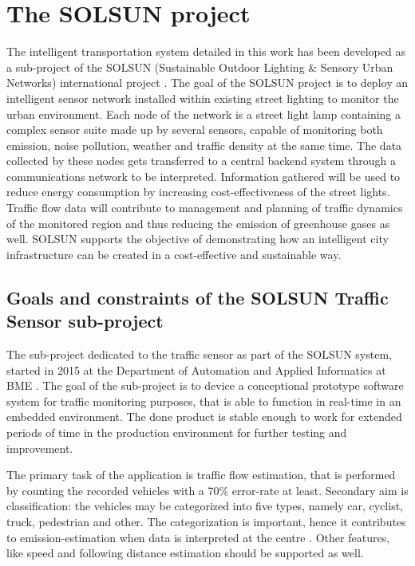 \section{The SOLSUN project}
The intelligent transportation system detailed in this work has been developed as a sub-project of the SOLSUN (Sustainable Outdoor Lighting \& Sensory Urban Networks) international project \cite{SOLSUN}.
The goal of the SOLSUN project is to deploy an intelligent sensor network installed within existing street lighting to monitor the urban environment.
Each node of the network is a street light lamp containing a complex sensor suite made up by several sensors, capable of monitoring both emission, noise pollution, weather and traffic density at the same time.
The data collected by these nodes gets transferred to a central backend system through a communications network to be interpreted.
Information gathered will be used to reduce energy consumption by increasing cost-effectiveness of the street lights.
Traffic flow data will contribute to management and planning of traffic dynamics of the monitored region and thus reducing the emission of greenhouse gases as well.
SOLSUN supports the objective of demonstrating how an intelligent city infrastructure can be created in a cost-effective and sustainable way.

\subsection{Goals and constraints of the SOLSUN Traffic Sensor sub-project}
The sub-project dedicated to the traffic sensor as part of the SOLSUN system, started in 2015 at the Department of Automation and Applied Informatics at BME \cite{SOLSUN_BME}.
The goal of the sub-project is to device a conceptional prototype software system for traffic monitoring purposes, that is able to function in real-time in an embedded environment.
The done product is stable enough to work for extended periods of time in the production environment for further testing and improvement.

The primary task of the application is traffic flow estimation, that is performed by counting the recorded vehicles with a 70\% error-rate at least.
Secondary aim is classification: the vehicles may be categorized into five types, namely car, cyclist, truck, pedestrian and other.
The categorization is important, hence it contributes to emission-estimation when data is interpreted at the centre \cite{Csorba2016}.
Other features, like speed and following distance estimation should be supported as well.


